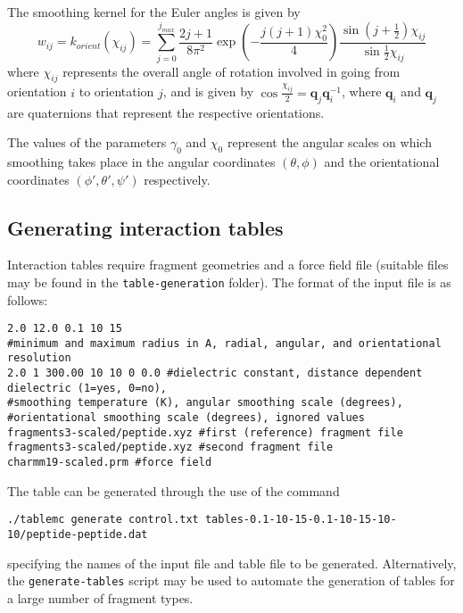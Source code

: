 \documentclass{article}      %
\begin{document}
The smoothing kernel for the Euler angles is given by 
\begin{equation}
w_{ij} = k_{orient}(\chi_{ij}) = \sum_{j=0}^{j_{max}} \frac{2j+1}{8\pi^2} \exp\left(-\frac{j(j+1)\chi_0^2}{4}\right)\frac{\sin \left(j+\frac{1}{2}\right)\chi_{ij}}{\sin \frac{1}{2}\chi_{ij}}
\end{equation}
where $\chi_{ij}$ represents the overall angle of rotation involved in going from orientation $i$ to orientation $j$, and is given by $\cos \frac{\chi_{ij}}{2} = \mathbf{q}_j \mathbf{q}_i^{-1}$, where $\mathbf{q}_i$ and $\mathbf{q}_j$ are quaternions that represent the respective orientations. 

The values of the parameters $\gamma_0$ and $\chi_0$ represent the angular scales on which smoothing takes place in the angular coordinates $(\theta,\phi)$ and the orientational coordinates $(\phi',\theta',\psi')$ respectively.  

\subsection{Generating interaction tables}


Interaction tables require fragment geometries and a force field file (suitable files may be found in the \verb+table-generation+ folder).  The format of the input file is as follows:
\begin{verbatim}
2.0 12.0 0.1 10 15
#minimum and maximum radius in A, radial, angular, and orientational resolution 
2.0 1 300.00 10 10 0 0.0 #dielectric constant, distance dependent dielectric (1=yes, 0=no),
#smoothing temperature (K), angular smoothing scale (degrees),
#orientational smoothing scale (degrees), ignored values
fragments3-scaled/peptide.xyz #first (reference) fragment file
fragments3-scaled/peptide.xyz #second fragment file
charmm19-scaled.prm #force field
\end{verbatim}

The table can be generated through the use of the command
\begin{verbatim}
./tablemc generate control.txt tables-0.1-10-15-0.1-10-15-10-10/peptide-peptide.dat
\end{verbatim}
specifying the names of the input file and table file to be generated.  Alternatively, the \verb+generate-tables+ script may be used to automate the generation of tables for a large number of fragment types.
\end{document}
